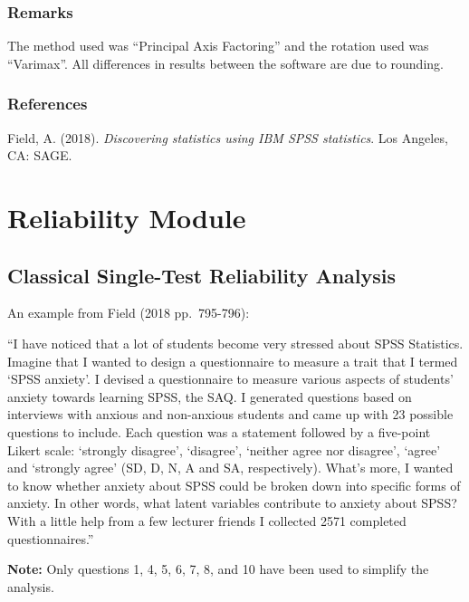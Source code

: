 \documentclass[
]{book}
\begin{document}
\hypertarget{remarks-1}{%
\subsection{Remarks}\label{remarks-1}}

The method used was ``Principal Axis Factoring'' and the rotation used was ``Varimax''. All differences in results between the software are due to rounding.

\hypertarget{references-1}{%
\subsection{References}\label{references-1}}

Field, A. (2018). \emph{Discovering statistics using IBM SPSS statistics}. Los Angeles, CA: SAGE.

\hypertarget{reliability-module}{%
\chapter{Reliability Module}\label{reliability-module}}

\hypertarget{classical-single-test-reliability-analysis}{%
\section{Classical Single-Test Reliability Analysis}\label{classical-single-test-reliability-analysis}}

An example from Field (2018 pp.~795-796):

``I have noticed that a lot of students become very stressed about SPSS Statistics. Imagine that I wanted to design a questionnaire to measure a trait that I termed `SPSS anxiety'. I devised a questionnaire to measure various aspects of students' anxiety towards learning SPSS, the SAQ. I generated questions based on interviews with anxious and non-anxious students and came up with 23 possible questions to include. Each question was a statement followed by a five-point Likert scale: `strongly disagree', `disagree', `neither agree nor disagree', `agree' and `strongly agree' (SD, D, N, A and SA, respectively). What's more, I wanted to know whether anxiety about SPSS could be broken down into specific forms of anxiety. In other words, what latent variables contribute to anxiety about SPSS? With a little help from a few lecturer friends I collected 2571 completed questionnaires.''

\textbf{Note:} Only questions 1, 4, 5, 6, 7, 8, and 10 have been used to simplify the analysis.
\end{document}
